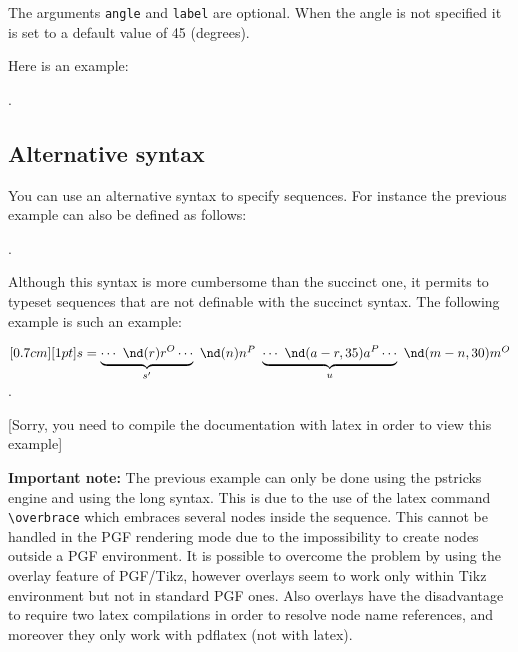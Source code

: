The arguments  \verb|angle| and \verb|label| are optional. When the angle is not specified it is set to a default value of 45 (degrees).

Here is an example:
\begin{codeexample}[width=7cm]
.
\end{codeexample}


\subsection{Alternative syntax}
\label{subsec:altsyntax}
You can use an alternative syntax to specify sequences. For instance the previous example
can also be defined as follows:
\begin{codeexample}[width=7cm]
.
\end{codeexample}
Although this syntax is more cumbersome than the succinct one, it permits to typeset sequences that are not definable with the succinct syntax. The following example is such an example:
\ifLoadPSengine
\begin{codeexample}[width=6cm]
$\pstr[0.7cm][1pt]{ s = \underbrace{\cdots\ \nd(r){r^O}
\cdots }_{s'}\ \nd(n){n^P}
\ \underbrace{\cdots\ \nd(a-r,35){a}^P \cdots }_{u}
\ \nd(m-n,30){m}^O }$.
\end{codeexample}
\else
\vskip 10pt
[Sorry, you need to compile the documentation with latex in order to view this example]
\vskip 10pt
\fi

{\bf Important note:}
The previous example can only be done using the pstricks engine and using the long syntax. This is due to the use of the
latex command \verb|\overbrace| which embraces several nodes inside the sequence.
This cannot be handled in the PGF rendering mode due to the impossibility to create nodes outside a PGF environment.
It is possible to overcome the problem by using the overlay feature of PGF/Tikz, however overlays seem to work only
within Tikz environment but not in standard PGF ones. Also overlays have the disadvantage
to require two latex compilations in order to resolve node name references, and moreover they only work with pdflatex (not with latex).


